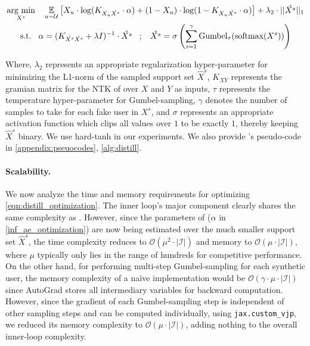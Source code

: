 \documentclass{article}
\begin{document}
\begin{align} \label{eqn:distill_optimization}
\begin{gathered}
    \underset{X^s}{\operatorname{arg}\,\operatorname{min}}\; \hspace{0.3cm} \underset{u \sim \mathcal{U}}{\mathbb{E}} \left[X_u \cdot \log(K_{X_u\hat{X^s}} \cdot \alpha) + (1 - X_u) \cdot \log(1 - K_{X_u\hat{X^s}} \cdot \alpha)\right] + \lambda_2 \cdot ||\hat{X^s}||_1 \\
    \text{s.t.} \hspace{0.3cm} \alpha = (K_{\hat{X^s}\hat{X^s}} + \lambda I)^{-1} \cdot \hat{X^s}
    \hspace{0.3cm} ; \hspace{0.3cm}
    \hat{X^s} = \sigma \left( \sum_{i=1}^{\gamma} \text{Gumbel}_{\tau}(\text{softmax}(X^s)) \right)
\end{gathered}
\end{align}

Where, $\lambda_2$ represents an appropriate regularization hyper-parameter for minimizing the L1-norm of the sampled support set $\hat{X}^s$, $K_{XY}$ represents the gramian matrix for the NTK of \model over $X$ and $Y$ as inputs, $\tau$ represents the temperature hyper-parameter for Gumbel-sampling, $\gamma$ denotes the number of samples to take for each fake user in $X^s$, and $\sigma$ represents an appropriate activation function which clips all values over $1$ to be exactly $1$, thereby keeping $\hat{X}^s$ binary. We use hard-tanh in our experiments. We also provide \sampler's pseudo-code in \cref{appendix:pseuocodes}, \cref{alg:distill}.

\paragraph{Scalability.} We now analyze the time and memory requirements for optimizing \cref{eqn:distill_optimization}. The inner loop's major component clearly shares the same complexity as \model. However, since the parameters of \model ($\alpha$ in \cref{inf_ae_optimization}) are now being estimated over the much smaller support set $\hat{X}^s$, the time complexity reduces to $\mathcal{O}(\mu^2 \cdot |\mathcal{I}|)$ and memory to $\mathcal{O}(\mu \cdot |\mathcal{I}|)$, where $\mu$ typically only lies in the range of hundreds for competitive performance. On the other hand, for performing multi-step Gumbel-sampling for each synthetic user, the memory complexity of a na\"ive implementation would be $\mathcal{O(\gamma \cdot \mu \cdot |\mathcal{I}|)}$ since AutoGrad stores all intermediary variables for backward computation. However, since the gradient of each Gumbel-sampling step is independent of other sampling steps and can be computed individually, using \texttt{jax.custom\_vjp}, we reduced its memory complexity to $\mathcal{O(\mu \cdot |\mathcal{I}|)}$, adding nothing to the overall inner-loop complexity. 
\end{document}
